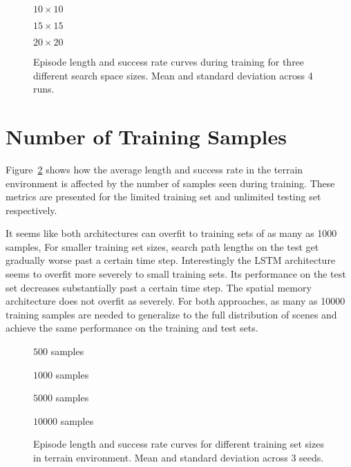 \begin{figure}
    \centering
    \(10 \times 10\)
    
    \(15 \times 15\)
    
    \(20 \times 20\)
    
    \caption[Learning curves for different search space sizes.]{Episode length and success rate curves during training for three different search space sizes. Mean and standard deviation across 4 runs.}
    \label{fig:shape}
\end{figure}

\section{Number of Training Samples}
\label{sec:sample}

Figure~\ref{fig:sample} shows how the average length and success rate in the terrain environment is affected by the number of samples seen during training.
These metrics are presented for the limited training set and unlimited testing set respectively.

It seems like both architectures can overfit to training sets of as many as 1000 samples,
For smaller training set sizes, search path lengths on the test get gradually worse past a certain time step.
Interestingly the LSTM architecture seems to overfit more severely to small training sets.
Its performance on the test set decreases substantially past a certain time step.
The spatial memory architecture does not overfit as severely.
For both approaches, as many as 10000 training samples are needed to generalize to the full distribution of scenes and achieve the same performance on the training and test sets. 

\begin{figure}
    \centering
    \(500\) samples
    
    \(1000\) samples
    
    \(5000\) samples
    
    \(10000\) samples
    
    \caption[Learning curves for varying training set sizes.]{Episode length and success rate curves for different training set sizes in terrain environment. Mean and standard deviation across 3 seeds.}
    \label{fig:sample}
\end{figure}
